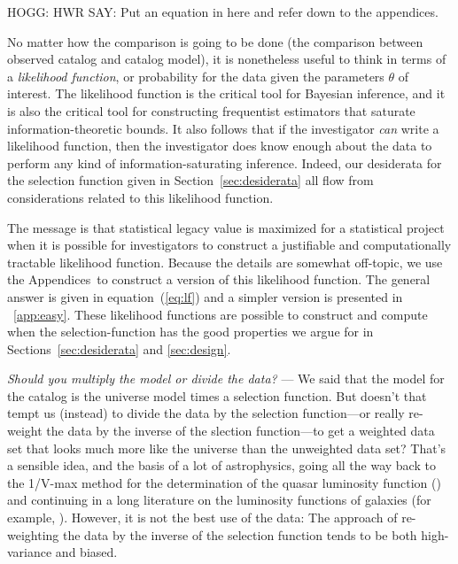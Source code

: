 \documentclass[modern]{aastex62}
\newcommand{\sectionname}{Section}
\newcommand{\appendixnames}{Appendices}
\newcommand{\equationname}{equation}
\renewcommand{\paragraph}[1]{\medskip\noindent\textit{#1} ---}
\begin{document}
HOGG: HWR SAY: Put an equation in here and refer down to the appendices.

No matter how the comparison is going to be done (the comparison between
observed catalog and catalog model), it is nonetheless
useful to think in
terms of a \emph{likelihood function}, or probability for the data given
the parameters $\theta$ of interest.
The likelihood function is the critical tool for Bayesian inference, and
it is also the critical tool for constructing frequentist estimators that
saturate information-theoretic bounds.
It also follows that if the investigator \emph{can} write a likelihood
function, then the investigator does know enough about the data to perform
any kind of information-saturating inference.
Indeed, our desiderata for the selection function given in
\sectionname~\ref{sec:desiderata} all flow from considerations related
to this likelihood function.

The message is that statistical legacy value is maximized for a
statistical project when it is possible for investigators to construct
a justifiable and computationally tractable likelihood function.
Because the details are somewhat off-topic, we use the
\appendixnames\ to construct a version of this likelihood function.
The general
answer is given in \equationname~(\ref{eq:lf}) and a simpler version
is presented in \appendixname~\ref{app:easy}.
These likelihood functions are possible to construct and compute when the
selection-function has the good properties we argue for in
\sectionname s~\ref{sec:desiderata} and \ref{sec:design}.

\paragraph{Should you multiply the model or divide the data?}
We said that the model for the catalog is the universe model times a
selection function.
But doesn't that tempt us (instead) to divide the data by the selection
function---or really re-weight the data by the inverse of the slection
function---to get a weighted data set that looks much more like the
universe than the unweighted data set?
That's a sensible idea, and the basis of a lot of astrophysics, going
all the way back to the 1/V-max method for the determination of the quasar
luminosity function (\citealt{schmidt}) and continuing in a long literature on the
luminosity functions of galaxies (for example, \citealt{cowie, blanton, faber}).
However, it is not the best use of the data:
The approach of re-weighting the data by the inverse of the
selection function tends to be both high-variance and biased.
\end{document}

